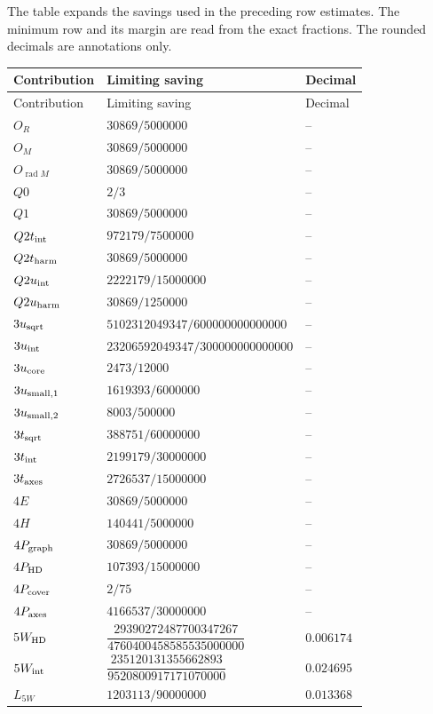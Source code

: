 \setlength{\LTleft}{0pt}
\setlength{\LTright}{0pt}
\renewcommand{\arraystretch}{1.35}
\footnotesize
\unnumtable
The table expands the savings used in the preceding row estimates. The
minimum row and its margin are read from the exact fractions. The rounded
decimals are annotations only.
\begin{longtable}{@{}p{}p{}p{}@{}}
\toprule
Contribution & Limiting saving & Decimal\\
\midrule
\endfirsthead
\toprule
Contribution & Limiting saving & Decimal\\
\midrule
\endhead
\(O_R\) & \(30869/5000000\) & --\\
\(O_M\) & \(30869/5000000\) & --\\
\(O_{\operatorname{rad}M}\) & \(30869/5000000\) & --\\
\(Q0\) & \(2/3\) & --\\
\(Q1\) & \(30869/5000000\) & --\\
\(Q2t_{\rm int}\) & \(972179/7500000\) & --\\
\(Q2t_{\rm harm}\) & \(30869/5000000\) & --\\
\(Q2u_{\rm int}\) & \(2222179/15000000\) & --\\
\(Q2u_{\rm harm}\) & \(30869/1250000\) & --\\
\(3u_{\rm sqrt}\) & \(5102312049347/600000000000000\) & --\\
\(3u_{\rm int}\) & \(23206592049347/300000000000000\) & --\\
\(3u_{\rm core}\) & \(2473/12000\) & --\\
\(3u_{\rm small,1}\) & \(1619393/6000000\) & --\\
\(3u_{\rm small,2}\) & \(8003/500000\) & --\\
\(3t_{\rm sqrt}\) & \(388751/60000000\) & --\\
\(3t_{\rm int}\) & \(2199179/30000000\) & --\\
\(3t_{\rm axes}\) & \(2726537/15000000\) & --\\
\(4E\) & \(30869/5000000\) & --\\
\(4H\) & \(140441/5000000\) & --\\
\(4P_{\rm graph}\) & \(30869/5000000\) & --\\
\(4P_{\rm HD}\) & \(107393/15000000\) & --\\
\(4P_{\rm cover}\) & \(2/75\) & --\\
\(4P_{\rm axes}\) & \(4166537/30000000\) & --\\
\(5W_{\rm HD}\) & \(\dfrac{29390272487700347267}{4760400458585535000000}\) & \(0.006174\)\\[4pt]
\(5W_{\rm int}\) & \(\dfrac{235120131355662893}{9520800917171070000}\) & \(0.024695\)\\[4pt]
\(L_{5W}\) & \(1203113/90000000\) & \(0.013368\)\\
\bottomrule
\end{longtable}
\renewcommand{\arraystretch}{1}
\normalsize

